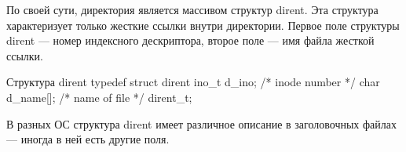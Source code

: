 По своей сути, директория является массивом структур dirent. Эта структура характеризует только жесткие ссылки внутри директории. Первое поле структуры dirent --- номер индексного дескриптора, второе поле --- имя файла жесткой ссылки.

\begin{CCode}{Структура dirent}
	typedef struct dirent { 
		ino_t d_ino;			/* inode number */
		char d_name[];			/* name of file */ 
	} dirent_t; \end{CCode}

В разных ОС структура dirent имеет различное описание в заголовочных файлах --- иногда в ней есть другие поля.